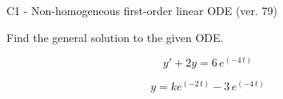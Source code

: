 \begin{exercise}
  \begin{exerciseTitle}C1 - Non-homogeneous first-order linear ODE (ver. 79)\end{exerciseTitle}
  \begin{exerciseStatement}
    
Find the general solution to the given ODE.

    
\[y'+2y= 6 \, e^{\left(-4 \, t\right)}\]

  \end{exerciseStatement}
  \begin{exerciseAnswer}
    
\[y= k e^{\left(-2 \, t\right)} - 3 \, e^{\left(-4 \, t\right)}\]

  \end{exerciseAnswer}
\end{exercise}